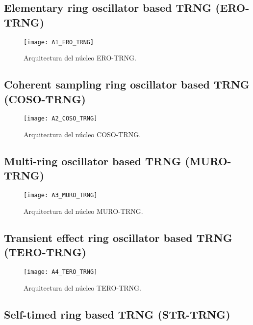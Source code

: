 		\subsection{Elementary ring oscillator based TRNG (ERO-TRNG)}
		
					
				\begin{figure}[hbtp]
					\caption{Arquitectura del núcleo ERO-TRNG.}
					\centering
					\texttt{[image: A1\_ERO\_TRNG]}
					\label{fig:A1_ERO_TRNG}
				\end{figure}
			
			
			
		\subsection{Coherent sampling ring oscillator based TRNG (COSO-TRNG)}
	
				
				\begin{figure}[hbtp]
					\caption{Arquitectura del núcleo COSO-TRNG.}
					\centering
					\texttt{[image: A2\_COSO\_TRNG]}
					\label{fig:A2_COSO_TRNG}
				\end{figure}
				
				
		\newpage		
		\subsection{Multi-ring oscillator based TRNG (MURO-TRNG)}
	
				
				\begin{figure}[hbtp]
					\caption{Arquitectura del núcleo MURO-TRNG.}
					\centering
					\texttt{[image: A3\_MURO\_TRNG]}
					\label{fig:A3_MURO_TRNG}
				\end{figure}
				
				
				
		\subsection{Transient effect ring oscillator based TRNG (TERO-TRNG)}
	
				
				\begin{figure}[hbtp]
					\caption{Arquitectura del núcleo TERO-TRNG.}
					\centering
					\texttt{[image: A4\_TERO\_TRNG]}
					\label{fig:A4_TERO_TRNG}
				\end{figure}
				
				
		\newpage	
		\subsection{Self-timed ring based TRNG (STR-TRNG)}
	
